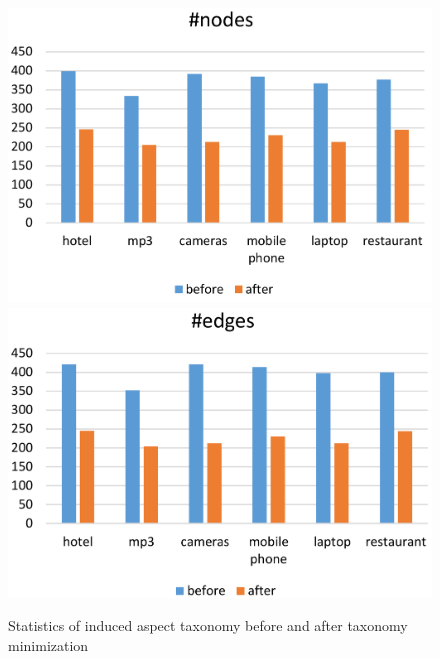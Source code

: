 \begin{figure}[h]
	\centering
	\includegraphics[width=0.48\columnwidth]{figures/1.pdf}
	\includegraphics[width=0.48\columnwidth]{figures/2.pdf}
	\caption{Statistics of induced aspect taxonomy before and after taxonomy minimization}
	\label{fig:size}
\end{figure}

